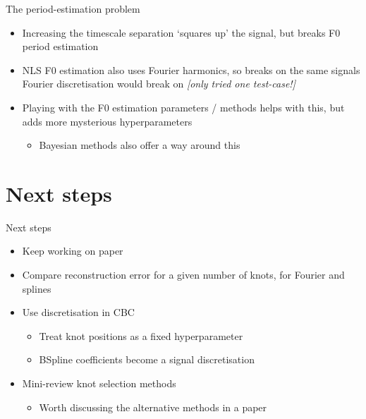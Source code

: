 \documentclass[presentation]{beamer}
\begin{document}
\begin{frame}[label={sec:org8b8ad31}]{The period-estimation problem}
\begin{itemize}
\item Increasing the timescale separation `squares up' the signal, but breaks F0 period estimation
\item NLS F0 estimation also uses Fourier harmonics, so breaks on the same signals Fourier discretisation would break on \emph{[only tried one test-case!]}
\item Playing with the F0 estimation parameters / methods helps with this, but adds more mysterious hyperparameters
\begin{itemize}
\item \alert{Bayesian methods also offer a way around this}
\end{itemize}
\end{itemize}
\end{frame}

\section{Next steps}
\label{sec:org64555e1}
\begin{frame}[label={sec:org0274cbd}]{Next steps}
\begin{itemize}
\item Keep working on paper
\item Compare reconstruction error for a given number of knots, for Fourier and splines
\item Use discretisation in CBC
\begin{itemize}
\item Treat knot positions as a fixed hyperparameter
\item BSpline coefficients become a signal discretisation
\end{itemize}
\item Mini-review knot selection methods
\begin{itemize}
\item Worth discussing the alternative methods in a paper
\end{itemize}
\end{itemize}
\end{frame}
\end{document}
